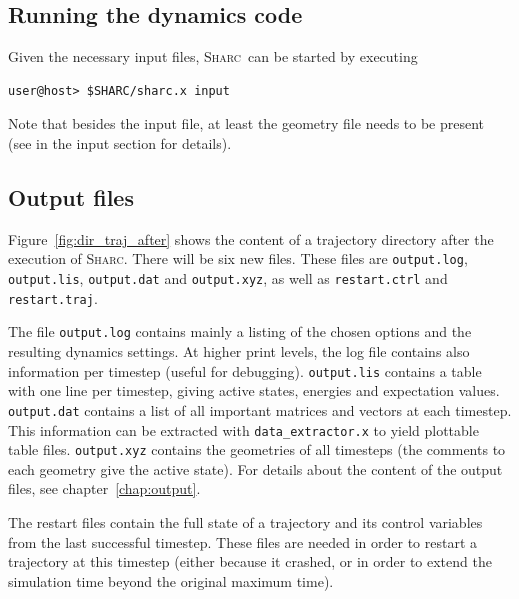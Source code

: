 \documentclass[a4paper,11pt,DIV=15,openany,twoside=false]{scrbook}
\newcommand{\sharc}{\textsc{Sharc}}
\newcommand{\ttt}[1]{\texttt{#1}}
\newenvironment{example}{
  \vspace{0mm}
  \definecolor{shadecolor}{HTML}{BBDDFF}
  \begin{shaded}
  \begin{minipage}{0.9\textwidth}
}{
  \end{minipage}
  \end{shaded}
}
\begin{document}
\subsection{Running the dynamics code}

Given the necessary input files, \sharc\ can be started by executing
\begin{example}
\begin{verbatim}
user@host> $SHARC/sharc.x input
\end{verbatim}
\end{example}
Note that besides the input file, at least the geometry file needs to be present (see in the input section for details).

\subsection{Output files}

Figure~\ref{fig:dir_traj_after} shows the content of a trajectory directory after the execution of \sharc. There will be six new files. These files are \ttt{output.log}, \ttt{output.lis}, \ttt{output.dat} and \ttt{output.xyz}, as well as \ttt{restart.ctrl} and \ttt{restart.traj}.

The file \ttt{output.log} contains mainly a listing of the chosen options and the resulting dynamics settings. At higher print levels, the log file contains also information per timestep (useful for debugging). \ttt{output.lis} contains a table with one line per timestep, giving active states, energies and expectation values. \ttt{output.dat} contains a list of all important matrices and vectors at each timestep. This information can be extracted with \ttt{data\_extractor.x} to yield plottable table files. \ttt{output.xyz} contains the geometries of all timesteps (the comments to each geometry give the active state).
For details about the content of the output files, see chapter~\ref{chap:output}.

The restart files contain the full state of a trajectory and its control variables from the last successful timestep. These files are needed in order to restart a trajectory at this timestep (either because it crashed, or in order to extend the simulation time beyond the original maximum time). 
\end{document}
